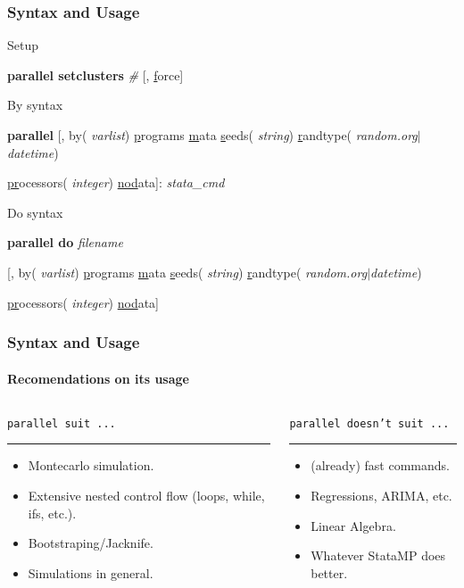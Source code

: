 \documentclass[9pt,handout]{beamer}
\begin{document}
\begin{frame}
\frametitle{Syntax and Usage}

Setup

\begin{semiverbatim}
\footnotesize
{\bf parallel setclusters} {\it \#}  [, \uline{f}orce] 
\end{semiverbatim}\pause

By syntax

\begin{semiverbatim}
\footnotesize
{\bf parallel} [, by({\it \color{blue} varlist}) \uline{p}rograms \uline{m}ata \uline{s}eeds({\it \color{blue} string}) \uline{r}andtype({\it \color{blue} random.org$|$datetime})

\hspace{1cm} \uline{pr}ocessors({\it \color{blue} integer}) \uline{nod}ata]:  {\it stata\_cmd}
\end{semiverbatim}\pause

Do syntax

\begin{semiverbatim}
\footnotesize
{\bf parallel do} {\it \color{blue} filename}

\hspace{1cm} [, by({\it \color{blue} varlist}) \uline{p}rograms \uline{m}ata \uline{s}eeds({\it \color{blue} string}) \uline{r}andtype({\it \color{blue} random.org$|$datetime})

\hspace{1cm} \uline{pr}ocessors({\it \color{blue} integer}) \uline{nod}ata]
\end{semiverbatim}

\end{frame}


\begin{frame}
\frametitle{Syntax and Usage}
\framesubtitle{Recomendations on its usage}

\begin{columns}
\begin{column}{.5\textwidth}
{\color{gray}
{\tt parallel suit ...}
\rule{\linewidth}{4pt}}
\begin{itemize}
\item Montecarlo simulation.\pause
\item Extensive nested control flow (loops, while, ifs, etc.).\pause
\item Bootstraping/Jacknife.\pause
\item Simulations in general.\pause
\end{itemize}
\end{column}%
\hfill%
\begin{column}{.5\textwidth}
{\color{gray}
{\tt parallel doesn't suit ...}
\rule{\linewidth}{4pt}}
\begin{itemize}
\item (already) fast commands.\pause
\item Regressions, ARIMA, etc.\pause
\item Linear Algebra.\pause
\item Whatever StataMP does better.
\end{itemize}
\end{column}%
\end{columns}
\end{frame}
\end{document}
